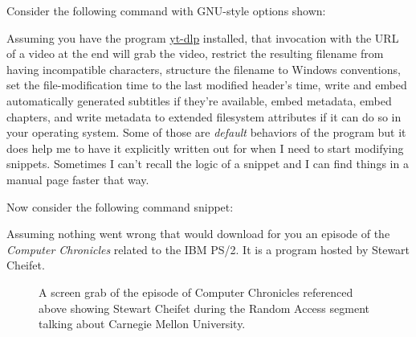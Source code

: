 Consider the following command with GNU-style options shown:

\begin{Shaded}
\begin{Highlighting}[]
          
\end{Highlighting}
\end{Shaded}

Assuming you have the program
\href{https://github.com/yt-dlp/yt-dlp}{yt-dlp} installed, that
invocation with the URL of a video at the end will grab the video,
restrict the resulting filename from having incompatible characters,
structure the filename to Windows conventions, set the file-modification
time to the last modified header's time, write and embed automatically
generated subtitles if they're available, embed metadata, embed
chapters, and write metadata to extended filesystem attributes if it can
do so in your operating system. Some of those are \emph{default}
behaviors of the program but it does help me to have it explicitly
written out for when I need to start modifying snippets. Sometimes I
can't recall the logic of a snippet and I can find things in a manual
page faster that way.

Now consider the following command snippet:

\begin{Shaded}
\begin{Highlighting}[]
          
\end{Highlighting}
\end{Shaded}

Assuming nothing went wrong that would download for you an episode of
the \emph{Computer Chronicles} related to the IBM PS/2. It is a program
hosted by Stewart Cheifet.

\begin{figure}
\centering
{}
\caption{A screen grab of the episode of Computer Chronicles referenced
above showing Stewart Cheifet during the Random Access segment talking
about Carnegie Mellon University.}
\end{figure}

